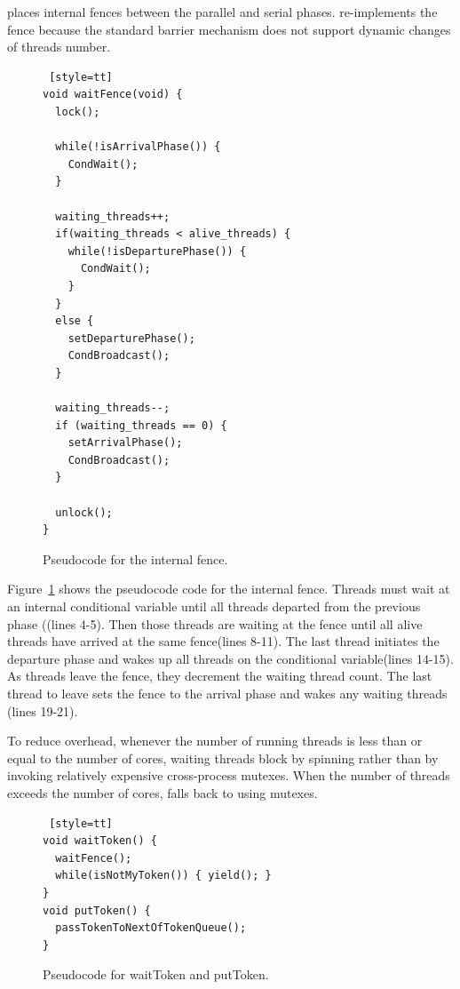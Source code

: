 \dthreads{} places internal fences between the parallel and serial phases. \dthreads{} re-implements the fence because the standard \pthreads{} barrier mechanism does not support dynamic changes of threads number. 

\begin{figure}
\begin{lstlisting} [style=tt]
void waitFence(void) {
  lock();
	
  while(!isArrivalPhase()) { 
    CondWait();
  }

  waiting_threads++;
  if(waiting_threads < alive_threads) {
    while(!isDeparturePhase()) {
      CondWait();
    }
  } 
  else {
    setDeparturePhase();
    CondBroadcast();
  }

  waiting_threads--;
  if (waiting_threads == 0) {
    setArrivalPhase();
    CondBroadcast();
  }

  unlock();
}

\end{lstlisting}
\caption{Pseudocode for the internal fence.\label{fig:internalFence}}
\end{figure}

Figure~\ref{fig:internalFence} shows the pseudocode code for the internal fence. Threads must wait at an internal conditional variable until all threads departed from the previous phase ((lines 4-5). Then those threads are waiting at the fence until all alive threads have arrived at the same fence(lines 8-11). The last thread initiates the departure phase and wakes up all threads on the conditional variable(lines 14-15). As threads leave the fence, they decrement the waiting thread count.  The last thread to leave sets the fence to the arrival phase and wakes any waiting threads (lines 19-21).

To reduce overhead, whenever the number of running threads is
less than or equal to the number of cores, waiting threads block by spinning rather than by invoking relatively expensive cross-process \pthreads{} mutexes. When the number of threads exceeds the number of cores, \dthreads{} falls back to using \pthreads{} mutexes.

\begin{figure}
\begin{lstlisting} [style=tt]
void waitToken() {
  waitFence();
  while(isNotMyToken()) { yield(); }
}
void putToken() {
  passTokenToNextOfTokenQueue();
}
\end{lstlisting}
\caption{Pseudocode for waitToken and putToken. 
\label{fig:token}}
\end{figure}

